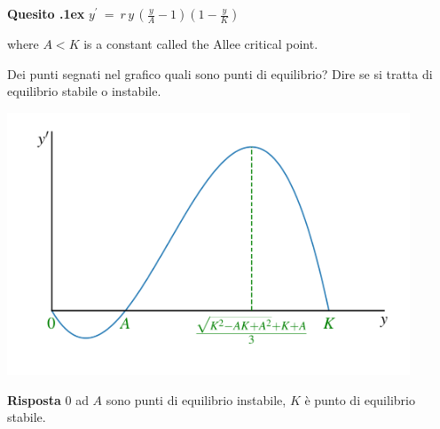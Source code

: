 \documentclass[11pt,twoside,a4paper]{article}
\newcounter{quesito}
\newenvironment{question}{\bigskip\addtocounter{quesito}{1}\bigskip\bigskip\par\textbf{Quesito \thequesito.\kern1ex}}{\vspace{\parskip}}
\newenvironment{answer}{\par\textbf{Risposta\quad}}{\vspace{\parskip}}
\begin{document}
\begin{question}
\hfil$\displaystyle y^\prime\ =\ r\, y\, \left( \frac{y}{A} - 1 \right) \left( 1 - \frac{y}{K} \right)$

where $A<K$ is a constant called the Allee critical point.

Dei punti segnati nel grafico quali sono punti di equilibrio?
Dire se si tratta di equilibrio stabile o instabile.

\hfil\includegraphics[width=0.9\textwidth]{Allee.pdf}

\begin{answer}
$0$ ad $A$ sono punti di equilibrio instabile, $K$ è punto di equilibrio stabile.


\end{answer}
\end{question}
\end{document}
